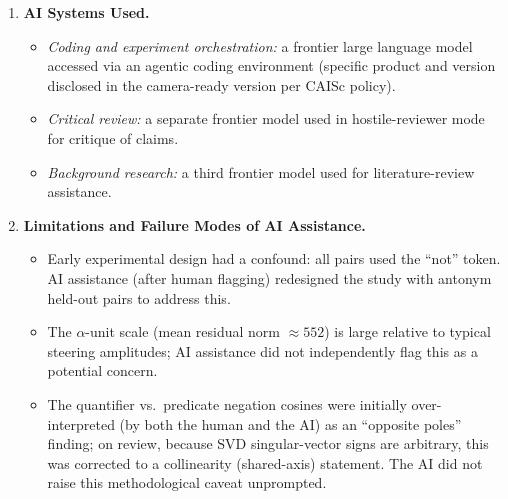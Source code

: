 \begin{enumerate}
\subsection*{AI System Documentation}

\item \textbf{AI Systems Used.}
\begin{itemize}
  \item \textit{Coding and experiment orchestration:} a frontier large language model accessed via an agentic coding environment (specific product and version disclosed in the camera-ready version per CAISc policy).
  \item \textit{Critical review:} a separate frontier model used in hostile-reviewer mode for critique of claims.
  \item \textit{Background research:} a third frontier model used for literature-review assistance.
\end{itemize}

\item \textbf{Limitations and Failure Modes of AI Assistance.}
\begin{itemize}
  \item Early experimental design had a confound: all pairs used the ``not'' token. AI assistance (after human flagging) redesigned the study with antonym held-out pairs to address this.
  \item The $\alpha$-unit scale (mean residual norm $\approx 552$) is large relative to typical steering amplitudes; AI assistance did not independently flag this as a potential concern.
  \item The quantifier vs.\ predicate negation cosines were initially over-interpreted (by both the human and the AI) as an ``opposite poles'' finding; on review, because SVD singular-vector signs are arbitrary, this was corrected to a collinearity (shared-axis) statement. The AI did not raise this methodological caveat unprompted.
\end{itemize}

\end{enumerate}
